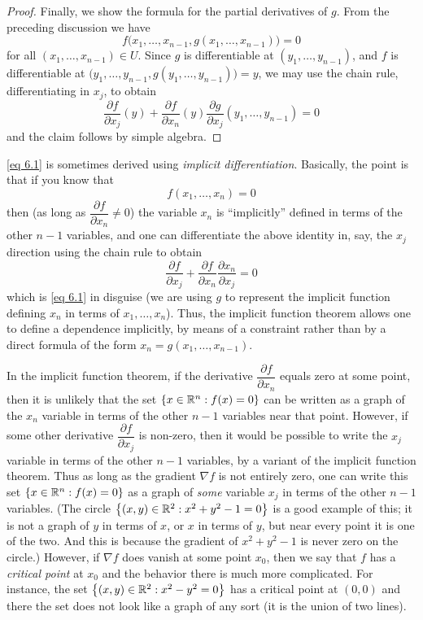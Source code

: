 \begin{proof}
  Finally, we show the formula for the partial derivatives of \(g\).
  From the preceding discussion we have
  \[
    f\big(x_1, \dots, x_{n - 1}, g(x_1, \dots, x_{n - 1})\big) = 0
  \]
  for all \((x_1, \dots, x_{n - 1}) \in U\).
  Since \(g\) is differentiable at \((y_1, \dots, y_{n - 1})\), and \(f\) is differentiable at \(\big(y_1, \dots, y_{n - 1}, g(y_1, \dots, y_{n - 1})\big) = y\), we may use the chain rule, differentiating in \(x_j\), to obtain
  \[
    \dfrac{\partial f}{\partial x_j}(y) + \dfrac{\partial f}{\partial x_n}(y) \dfrac{\partial g}{\partial x_j}(y_1, \dots, y_{n - 1}) = 0
  \]
  and the claim follows by simple algebra.
\end{proof}

\begin{rmk}\label{6.8.2}
  \cref{eq 6.1} is sometimes derived using \emph{implicit differentiation}.
  Basically, the point is that if you know that
  \[
    f(x_1, \dots, x_n) = 0
  \]
  then (as long as \(\dfrac{\partial f}{\partial x_n} \neq 0\)) the variable \(x_n\) is ``implicitly'' defined in terms of the other \(n - 1\) variables, and one can differentiate the above identity in, say, the \(x_j\) direction using the chain rule to obtain
  \[
    \dfrac{\partial f}{\partial x_j} + \dfrac{\partial f}{\partial x_n} \dfrac{\partial x_n}{\partial x_j} = 0
  \]
  which is \cref{eq 6.1} in disguise
  (we are using \(g\) to represent the implicit function defining \(x_n\) in terms of \(x_1, \dots, x_n\)).
  Thus, the implicit function theorem allows one to define a dependence implicitly, by means of a constraint rather than by a direct formula of the form \(x_n = g(x_1, \dots, x_{n - 1})\).
\end{rmk}

\begin{note}
  In the implicit function theorem, if the derivative \(\dfrac{\partial f}{\partial x_n}\) equals zero at some point, then it is unlikely that the set \(\left\lbrace x \in \mathbb{R}^n : f(x) = 0\right\rbrace\) can be written as a graph of the \(x_n\) variable in terms of the other \(n - 1\) variables near that point.
  However, if some other derivative \(\dfrac{\partial f}{\partial x_j}\) is non-zero, then it would be possible to write the \(x_j\) variable in terms of the other \(n - 1\) variables, by a variant of the implicit function theorem.
  Thus as long as the gradient \(\nabla f\) is not entirely zero, one can write this set \(\left\lbrace x \in \mathbb{R}^n : f(x) = 0\right\rbrace\) as a graph of \emph{some} variable \(x_j\) in terms of the other \(n - 1\) variables.
  (The circle \(\left\lbrace(x, y) \in \mathbb{R}^2 : x^2 + y^2 - 1 = 0\right\rbrace\) is a good example of this;
  it is not a graph of \(y\) in terms of \(x\), or \(x\) in terms of \(y\), but near every point it is one of the two.
  And this is because the gradient of \(x^2 + y^2 - 1\) is never zero on the circle.)
  However, if \(\nabla f\) does vanish at some point \(x_0\), then we say that \(f\) has a \emph{critical point} at \(x_0\) and the behavior there is much more complicated.
  For instance, the set \(\left\lbrace(x, y) \in \mathbb{R}^2 : x^2 - y^2 = 0\right\rbrace\) has a critical point at \((0, 0)\) and there the set does not look like a graph of any sort
  (it is the union of two lines).
\end{note}

